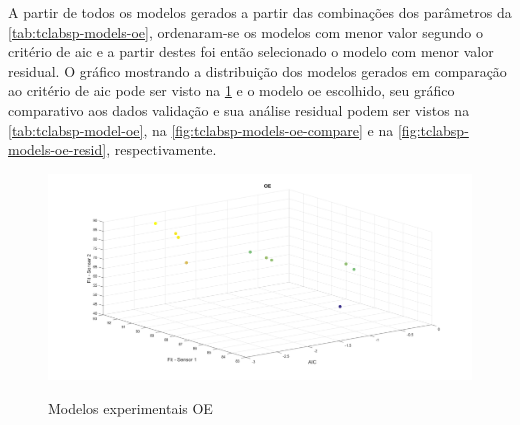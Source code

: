 A partir de todos os modelos gerados a partir das combinações dos parâmetros da \cref{tab:tclabsp-models-oe},
ordenaram-se os modelos com menor valor segundo o critério de \acrshort{aic} e a partir destes foi então
selecionado o modelo com menor valor residual.
O gráfico mostrando a distribuição dos modelos gerados em comparação ao critério de \acrshort{aic} pode ser
visto na \cref{fig:tclabsp-models-oe} e o modelo \acrshort{oe} escolhido, seu gráfico comparativo aos dados validação
e sua análise residual podem ser vistos na \cref{tab:tclabsp-model-oe}, na \cref{fig:tclabsp-models-oe-compare} e na
\cref{fig:tclabsp-models-oe-resid}, respectivamente.

\begin{figure}[h]
	\caption{Modelos experimentais OE}
	\begin{center}
		\includegraphics[width=1.00\textwidth]{./5_images/tclabsp-models-OE.png} 
		\label{fig:tclabsp-models-oe}
	\end{center}
	\centering
\end{figure}

